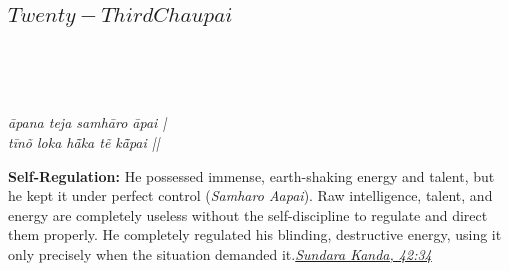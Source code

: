 
\newpage

\subsection*{ \(Twenty-Third Chaupai\)}

\begin{minipage}[t]{0.55\textwidth}
\vspace{0pt}

{\large \linespread{1.5}\selectfont
{}\\
\par}

\vspace{0.5em}

{\large \linespread{1.5}\selectfont
{}\\
\par}

\vspace{0.5em}

{\large \linespread{1.3}\selectfont
\textit{āpana teja samhāro āpai |}\\
\textit{tīnõ loka hā̃ka tẽ kā̃pai ||}
\par}
\end{minipage}%
\hfill
\begin{minipage}[t]{0.42\textwidth}
\vspace{0pt}
\begin{tcolorbox}[anchorbox]
\textbf{Self-Regulation:} He possessed immense, earth-shaking energy and talent, but he kept it under perfect control (\textit{Samharo Aapai}). Raw intelligence, talent, and energy are completely useless without the self-discipline to regulate and direct them properly.
\vspace{0.5em}\newline He completely regulated his blinding, destructive energy, using it only precisely when the situation demanded it.\newline\null\hfill\href{https://www.valmiki.iitk.ac.in/sloka?field_kanda_tid=5&language=dv&field_sarga_value=42}{\textit{Sundara Kanda, 42:34}}
\end{tcolorbox}
\end{minipage}

\vspace{0.5em}
